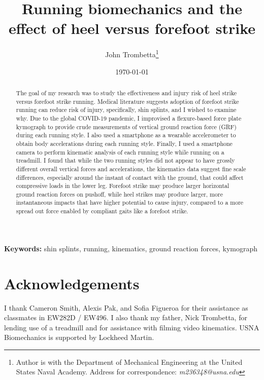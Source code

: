 \documentclass[10pt]{article}
\title{Running biomechanics and the effect of heel versus forefoot strike}
\author{John Trombetta\thanks{Author is with the Department of Mechanical Engineering at the United States Naval Academy. Address for correspondence: \emph{m236348@usna.edu}}}
\date{\today}
\begin{document}
\maketitle
\begin{abstract}
The goal of my research was to study the effectiveness and injury risk of heel strike versus forefoot strike running. Medical literature suggests adoption of forefoot strike running can reduce risk of injury, specifically, shin splints, and I wished to examine why. Due to the global COVID-19 pandemic, I improvised a flexure-based force plate kymograph to provide crude measurements of vertical ground reaction force (GRF) during each running style. I also used a smartphone as a wearable accelerometer to obtain body accelerations during each running style. Finally, I used a smartphone camera to perform kinematic analysis of each running style while running on a treadmill. I found that while the two running styles did not appear to have grossly different overall vertical forces and accelerations, the kinematics data suggest fine scale differences, especially around the instant of contact with the ground, that could affect compressive loads in the lower leg. Forefoot strike may produce larger horizontal ground reaction forces on pushoff, while heel strikes may produce larger, more instantaneous impacts that have higher potential to cause injury, compared to a more spread out force enabled by compliant gaits like a forefoot strike.  
\end{abstract}
{\scriptsize\textbf{Keywords: }shin splints, running, kinematics, ground reaction forces, kymograph}


\section{Acknowledgements}
I thank Cameron Smith, Alexis Pak, and Sofia Figueroa for their assistance as classmates in EW282D / EW496. I also thank my father, Nick Trombetta, for lending use of a treadmill and for assistance with filming video kinematics. USNA Biomechanics is supported by Lockheed Martin. 



%
\end{document}
